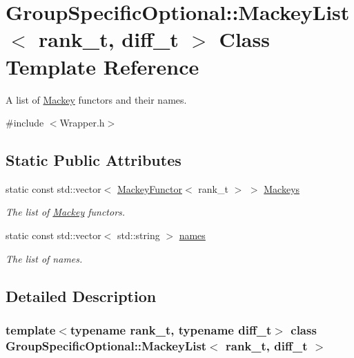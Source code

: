 \hypertarget{classGroupSpecificOptional_1_1MackeyList}{}\section{Group\+Specific\+Optional\+:\+:Mackey\+List$<$ rank\+\_\+t, diff\+\_\+t $>$ Class Template Reference}
\label{classGroupSpecificOptional_1_1MackeyList}


A list of \hyperlink{namespaceMackey}{Mackey} functors and their names.  




{\ttfamily \#include $<$Wrapper.\+h$>$}

\subsection*{Static Public Attributes}
\begin{DoxyCompactItemize}
\item 
static const std\+::vector$<$ \hyperlink{classMackey_1_1MackeyFunctor}{Mackey\+Functor}$<$ rank\+\_\+t $>$ $>$ \hyperlink{classGroupSpecificOptional_1_1MackeyList_abffda7eb6d7cd59f7ea8acb8b6eeb88a}{Mackeys}
\begin{DoxyCompactList}\small\item\em The list of \hyperlink{namespaceMackey}{Mackey} functors. \end{DoxyCompactList}\item 
static const std\+::vector$<$ std\+::string $>$ \hyperlink{classGroupSpecificOptional_1_1MackeyList_a306cea4e8666fb46637a988b84ea477d}{names}
\begin{DoxyCompactList}\small\item\em The list of names. \end{DoxyCompactList}\end{DoxyCompactItemize}


\subsection{Detailed Description}
\subsubsection*{template$<$typename rank\+\_\+t, typename diff\+\_\+t$>$\newline
class Group\+Specific\+Optional\+::\+Mackey\+List$<$ rank\+\_\+t, diff\+\_\+t $>$}

